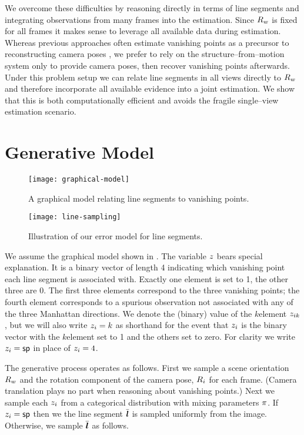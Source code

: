We overcome these difficulties by reasoning directly in terms of line
segments and integrating observations from many frames into the
estimation. Since $\SceneR$ is fixed for all frames it makes sense to
leverage all available data during estimation. Whereas previous
approaches often estimate vanishing points as a precursor to
reconstructing camera poses \cite{Zhang02,Werner02}, we prefer to rely
on the structure--from--motion system only to provide camera poses,
then recover vanishing points afterwards. Under this problem setup we
can relate line segments in all views directly to $\SceneR$ and
therefore incorporate all available evidence into a joint
estimation. We show that this is both computationally efficient and
avoids the fragile single--view estimation scenario.

\section{Generative Model}

\begin{figure}[tb]
  \centering
  \texttt{[image: graphical-model]}
  \caption{A graphical model relating line segments to vanishing
    points.}
  \label{fig:R-graphical}
\end{figure}

\begin{figure}[tb]
  \centering
  \texttt{[image: line-sampling]}
  \caption{Illustration of our error model for line segments.}
  \label{fig:line-sampling}
\end{figure}

We assume the graphical model shown in . The
variable $\Indicator$ bears special explanation. It is a binary vector
of length 4 indicating which vanishing point each line segment is
associated with. Exactly one element is set to 1, the other three are
0. The first three elements correspond to the three vanishing points;
the fourth element corresponds to a spurious observation not
associated with any of the three Manhattan directions. We denote the
(binary) value of the $k$\th element $\Indicator_{ik}$, but we will
also write $\Indicator_i=k$ as shorthand for the event that
$\Indicator_i$ is the binary vector with the $k$\th element set to 1
and the others set to zero. For clarity we write
$\Indicator_i=\Spurious$ in place of $\Indicator_i=4$.

The generative process operates as follows. First we sample a scene
orientation $\SceneR$ and the rotation component of the camera pose,
$\CamR_i$ for each frame. (Camera translation plays no part when
reasoning about vanishing points.) Next we sample each
$\Indicator_i$ from a categorical distribution with mixing parameters
$\Mixing$. If $\Indicator_i=\Spurious$ then we the line segment
$\TrueSeg$ is sampled uniformly from the image. Otherwise, we sample
$\TrueSeg$ as follows.

